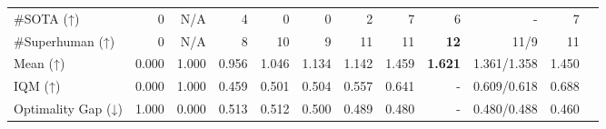 \documentclass{article}
\begin{document}
\begin{table}[t]
\begin{tabular}{
        l                                %
        rrrrrrrrrrr                   %
    }
\midrule
\#SOTA (↑)           &  0         &  N/A       &  4                  &  0         &  0           &  2                  &  7                  &  6                  &  -                                         &  7                 \\
\#Superhuman (↑)     &  0         &  N/A       &  8                  &  10        &  9           &  11                 &  11                 &  \textbf{12}        &  \textcolor{pastelgreen}{11}/9             &  11                 \\
Mean (↑)             &  0.000     &  1.000     &  0.956              &  1.046     &  1.134       &  1.142              &  1.459              &  \textbf{1.621}     &  \textcolor{pastelgreen}{1.361}/1.358      &  1.450              \\
IQM (↑)              &  0.000     &  1.000     &  0.459              &  0.501     &  0.504       &  0.557              &  0.641              &  -                  &  0.609/\textcolor{pastelgreen}{0.618}      &  0.688              \\
Optimality Gap (↓)   &  1.000     &  0.000     &  0.513              &  0.512     &  0.500       &  0.489              &  0.480              &  -                  &  0.480/\textcolor{pastelgreen}{0.488}      &  0.460              \\
      \bottomrule
    \end{tabular}
\end{table}
\newpage



\newpage
\clearpage
\pagebreak
% 
\end{document}
